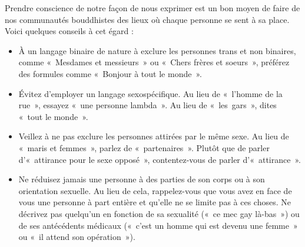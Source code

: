 \documentclass[12pt,openany]{book}
\begin{document}
\noindent Prendre conscience de notre façon de nous exprimer est un bon moyen de faire de nos communautés bouddhistes des lieux où chaque personne se sent à sa place. Voici quelques conseils à cet égard :

\begin{itemize}[label=\textbullet]
\setlength\itemsep{-0.3em}
\item À un langage binaire de nature à exclure les personnes trans et non binaires, comme \mbox{« M}esdames et messieur\mbox{s »} ou \mbox{« C}hers frères et soeur\mbox{s »}, préférez des formules comme \mbox{« B}onjour à tout le mond\mbox{e »}.
\item Évitez d’employer un langage sexospécifique. Au lieu de \mbox{« l}’homme de la ru\mbox{e »}, essayez \mbox{« u}ne personne lambd\mbox{a »}. Au lieu de \mbox{« les gars »}, dites \mbox{« t}out le mond\mbox{e »}.
\item Veillez à ne pas exclure les personnes attirées par le même sexe. Au lieu de \mbox{« m}aris et femme\mbox{s »}, parlez de \mbox{« partenaires »}. Plutôt que de parler d’\mbox{« a}ttirance pour le sexe oppos\mbox{é »}, contentez-vous de parler d’\mbox{« attirance »}.
\item Ne réduisez jamais une personne à des parties de son corps ou à son orientation sexuelle. Au lieu de cela, rappelez-vous que vous avez en face de vous une personne à part entière et qu’elle ne se limite pas à ces choses. Ne décrivez pas quelqu’un en fonction de sa sexualité (\mbox{« c}e mec gay là-ba\mbox{s »}) ou de ses antécédents médicaux (\mbox{« c}’est un homme qui est devenu une femm\mbox{e »} ou \mbox{« i}l attend son opératio\mbox{n »}).
\end{itemize}

\begin{figure}[h]
    \centering
\end{figure}
\end{document}
